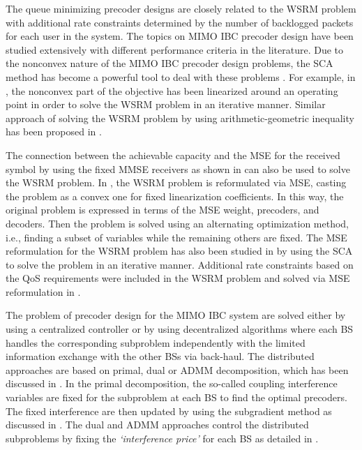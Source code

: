 The queue minimizing precoder designs are closely related to the \ac{WSRM} problem with additional rate constraints determined by the number of backlogged packets for each user in the system. The topics on \ac{MIMO} \ac{IBC} precoder design have been studied extensively with different performance criteria in the literature. Due to the nonconvex nature of the \ac{MIMO} \ac{IBC} precoder design problems, the \ac{SCA} method has become a powerful tool to deal with these problems \cite{bertsekas1999nonlinear}. For example, in \cite{sin_algorithm}, the nonconvex part of the objective has been linearized around an operating point in order to solve the \ac{WSRM} problem in an iterative manner. Similar approach of solving the \ac{WSRM} problem by using arithmetic-geometric inequality has been proposed in \cite{tran2012fast}.

The connection between the achievable capacity and the \ac{MSE} for the received symbol by using the fixed \ac{MMSE} receivers as shown in \cite{viswanath1999optimal,mse_duality} can also be used to solve the \ac{WSRM} problem. In \cite{christensen2008weighted,wmmse_shi}, the \ac{WSRM} problem is reformulated via \ac{MSE}, casting the problem as a convex one for fixed linearization coefficients. In this way, the original problem is expressed in terms of the \ac{MSE} weight, precoders, and decoders. Then the problem is solved using an alternating optimization method, i.e., finding a subset of variables while the remaining others are fixed. The \ac{MSE} reformulation for the \ac{WSRM} problem has also been studied in \cite{hong2012decomposition} by using the \ac{SCA} to solve the problem in an iterative manner. Additional rate constraints based on the \ac{QoS} requirements were included in the \ac{WSRM} problem and solved via \ac{MSE} reformulation in \cite{kaleva2013primal,kaleva2013decentralized}.

The problem of precoder design for the \ac{MIMO} \ac{IBC} system are solved either by using a centralized controller or by using decentralized algorithms where each \ac{BS} handles the corresponding subproblem independently with the limited information exchange with the other \acp{BS} via back-haul. The distributed approaches are based on primal, dual or \ac{ADMM} decomposition, which has been discussed in \cite{palomar2006tutorial,boyd2011distributed}. In the  primal decomposition, the so-called coupling interference variables are fixed for the subproblem at each \ac{BS} to find the optimal precoders. The fixed interference are then updated by using the subgradient method as discussed in \cite{pennanen2011decentralized}. The dual and \ac{ADMM} approaches control the distributed subproblems by fixing the \emph{`interference price'} for each \ac{BS} as detailed in \cite{tolli2011decentralized}.


